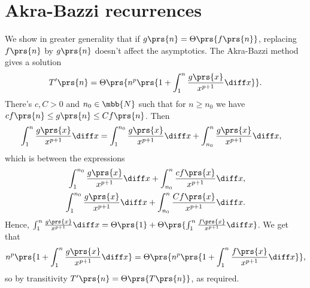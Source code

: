 \documentclass[oneside]{scrbook}
\theoremstyle{definition}
\begin{document}
\section{Akra-Bazzi recurrences}

\begin{exercise}
We show in greater generality that if $g\prs{n} = \Theta\prs{f\prs{n}}$, replacing $f\prs{n}$ by $g\prs{n}$ doesn't affect the asymptotics.
The Akra-Bazzi method gives a solution
\begin{align*}
T'\prs{n} = \Theta\prs{n^p \prs{1 + \int_1^n \frac{g\prs{x}}{x^{p+1}} \diff x}} \text{.}
\end{align*}
There's $c, C > 0$ and $n_0 \in \mbb{N}$ such that for $n \geq n_0$ we have $c f\prs{n} \leq g\prs{n} \leq C f\prs{n}$. Then
\begin{align*}
\int_1^n \frac{g\prs{x}}{x^{p+1}} \diff x &= \int_1^{n_0} \frac{g\prs{x}}{x^{p+1}} \diff x + \int_{n_0}^n \frac{g\prs{x}}{x^{p+1}} \diff x \text{,}
\end{align*}
which is between the expressions
\begin{align*}
\int_1^{n_0} \frac{g\prs{x}}{x^{p+1}} \diff x + \int_{n_0}^n \frac{cf\prs{x}}{x^{p+1}} \diff x \text{,} \\
\int_1^{n_0} \frac{g\prs{x}}{x^{p+1}} \diff x + \int_{n_0}^n \frac{Cf\prs{x}}{x^{p+1}} \diff x \text{.}
\end{align*}
Hence,
$\int_1^n \frac{g\prs{x}}{x^{p+1}} \diff x = \Theta\prs{1} + \Theta\prs{\int_1^n \frac{f\prs{x}}{x^{p+1}} \diff x}$. We get that
\[n^p\prs{1 + \int_1^n \frac{g\prs{x}}{x^{p+1}} \diff x} = \Theta\prs{n^p \prs{1 + \int_1^n \frac{f\prs{x}}{x^{p+1}} \diff x}} \text{,}\]
so by transitivity $T'\prs{n} = \Theta\prs{T\prs{n}}$, as required.
\end{exercise}
\end{document}

